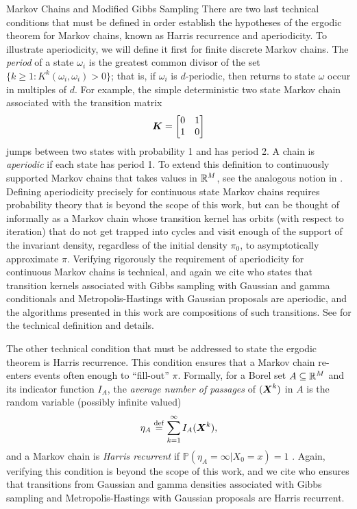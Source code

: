 \begin{chapter}{Markov Chains and Modified Gibbs Sampling}
There are two last technical conditions that must be defined in order establish the hypotheses of the ergodic theorem for Markov chains, known as Harris recurrence and aperiodicity.
To illustrate aperiodicity, we will define it first for finite discrete Markov chains.
The \emph{period} of a state $\omega_i$ is the greatest common divisor of the set $\{k\ge 1: K^k(\omega_i,\omega_i) > 0\}$; that is, if $\omega_i$ is $d$-periodic, then returns to state $\omega$ occur in multiples of $d$.
For example, the simple deterministic two state Markov chain associated with the transition matrix
\begin{equation}
  \mbox{\boldmath$K$} = \begin{bmatrix}
    0 & 1\\
    1 & 0
  \end{bmatrix}
\end{equation}
jumps between two states with probability 1 and has period 2.
A chain is \emph{aperiodic} if each state has period 1. 
To extend this definition to continuously supported Markov chains that takes values in $\mathbb R^M$, see the analogous notion in \citep[Chapter 6.3]{robert2013monte}.
Defining aperiodicity precisely for continuous state Markov chains requires probability theory that is beyond the scope of this work, but can be thought of informally as a Markov chain whose transition kernel has orbits (with respect to iteration) that do not get trapped into cycles and visit enough of the support of the invariant density, regardless of the initial density $\pi_0$, to asymptotically approximate $\pi$. 
Verifying rigorously the requirement of aperiodicity for continuous Markov chains is technical, and again we cite \citep{liu2008monte} who states that transition kernels associated with Gibbs sampling with Gaussian and gamma conditionals and Metropolis-Hastings with Gaussian proposals are aperiodic, and the algorithms presented in this work are compositions of such transitions.
See \citep{robert2013monte} for the technical definition and details.

The other technical condition that must be addressed to state the ergodic theorem is Harris recurrence. 
This condition ensures that a Markov chain re-enters events often enough to ``fill-out'' $\pi$. 
Formally, for a Borel set $A\subseteq \mathbb R^M$ and its indicator function $I_A$, the \emph{average number of passages} of $(\mbox{\boldmath$X$}^k)$ in $A$ is the random variable (possibly infinite valued)
\begin{equation}
  \eta_A\stackrel{\rm def}{=} \sum_{k=1}^\infty I_A(\mbox{\boldmath$X$}^k),
\end{equation}
and a Markov chain is \emph{Harris recurrent} if $\mathbb P(\eta_A = \infty|X_0=x) =1$ \citep{robert2013monte}. 
Again, verifying this condition is beyond the scope of this work, and we cite \citep{liu2008monte} who ensures that transitions from Gaussian and gamma densities associated with Gibbs sampling and Metropolis-Hastings with Gaussian proposals are Harris recurrent.


\end{chapter}
